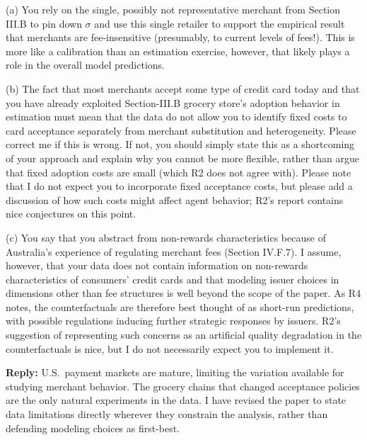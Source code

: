\documentclass[main.tex]{subfiles}
\begin{document}
\begin{refsection}
\begin{refcommentnoclear}
(a) You rely on the single, possibly not representative merchant from Section III.B to pin down $\sigma$ and use this single retailer to support the empirical result that merchants are fee-insensitive (presumably, to current levels of fees!).
This is more like a calibration than an estimation exercise, however, that likely plays a role in the overall model predictions.

(b) The fact that most merchants accept some type of credit card today and that you have already exploited Section-III.B grocery store’s adoption behavior in estimation must mean that the data do not allow you to identify fixed costs to card acceptance separately from merchant substitution and heterogeneity.
Please correct me if this is wrong.
If not, you should simply state this as a shortcoming of your approach and explain why you cannot be more flexible, rather than argue that fixed adoption costs are small (which R2 does not agree with).
Please note that I do not expect you to incorporate fixed acceptance costs, but please add a discussion of how such costs might affect agent behavior; R2’s report contains nice conjectures on this point.

(c) You say that you abstract from non-rewards characteristics because of Australia’s experience of regulating merchant fees (Section IV.F.7).
I assume, however, that your data does not contain information on non-rewards characteristics of consumers’ credit cards and that modeling issuer choices in dimensions other than fee structures is well beyond the scope of the paper.
As R4 notes, the counterfactuals are therefore best thought of as short-run predictions, with possible regulations inducing further strategic responses by issuers.
R2’s suggestion of representing such concerns as an artificial quality degradation in the counterfactuals is nice, but I do not necessarily expect you to implement it.

\end{refcommentnoclear}

\textbf{Reply:} U.S.\ payment markets are mature,
limiting the variation available for studying merchant behavior.
The grocery chains that changed acceptance policies are the only natural experiments in the data.
I have revised the paper to state data limitations directly wherever they constrain the analysis, rather than defending modeling choices as first-best.


\end{refsection}
\end{document}
